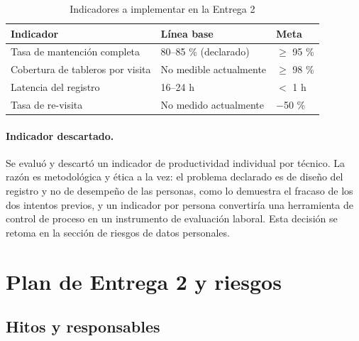 \documentclass[10pt,letterpaper]{article}
\begin{document}
\begin{table}[H]
\centering
\small
\begin{tabular}{@{}p{5.5cm}p{3.5cm}p{3.5cm}@{}}
\toprule
\textbf{Indicador} & \textbf{Línea base} & \textbf{Meta} \\
\midrule
Tasa de mantención completa & 80--85 \% (declarado) & $\geq$ 95 \% \\
Cobertura de tableros por visita & No medible actualmente & $\geq$ 98 \% \\
Latencia del registro & 16--24 h & $<$ 1 h \\
Tasa de re-visita & No medido actualmente & $-$50 \% \\
\bottomrule
\end{tabular}
\caption{Indicadores a implementar en la Entrega 2}
\end{table}

\paragraph{Indicador descartado.} Se evaluó y descartó un indicador de productividad
individual por técnico. La razón es metodológica y ética a la vez: el problema
declarado es de diseño del registro y no de desempeño de las personas, como lo
demuestra el fracaso de los dos intentos previos, y un indicador por persona
convertiría una herramienta de control de proceso en un instrumento de evaluación
laboral. Esta decisión se retoma en la sección de riesgos de datos personales.

\section{Plan de Entrega 2 y riesgos}

\subsection{Hitos y responsables}
\end{document}
